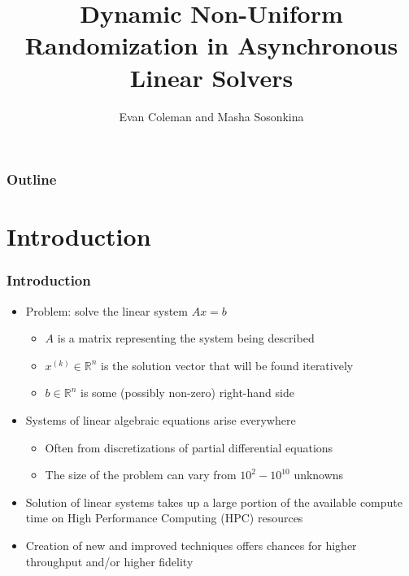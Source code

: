 \documentclass{beamer}
\title[Randomized Asynchronous Linear Solvers]{Dynamic Non-Uniform Randomization in Asynchronous Linear Solvers}
\author[Coleman \& Sosonkina]{Evan Coleman and Masha Sosonkina}
\date{}
\begin{document}
%
\begin{frame}
	\titlepage
\end{frame}


\begin{frame}
	\frametitle{Outline}
	\tableofcontents
\end{frame}

\section{Introduction}

\begin{frame}
	\frametitle{Introduction}
	\begin{itemize}
		\item Problem: solve the linear system $Ax = b$
			\begin{itemize}
				\item $A$ is a matrix representing the system being described
				\item $x^{(k)} \in \mathbb{R}^n$ is the solution vector that will be found iteratively
				\item $b \in \mathbb{R}^n$ is some (possibly non-zero) right-hand side
			\end{itemize}
		\item Systems of linear algebraic equations arise everywhere
			\begin{itemize}
				\item Often from discretizations of partial differential equations
				\item The size of the problem can vary from $10^2 - 10^{10}$ unknowns
			\end{itemize}
		\item Solution of linear systems takes up a large portion of the available compute time on High Performance Computing (HPC) resources
		\item Creation of new and improved techniques offers chances for higher throughput and/or higher fidelity
	\end{itemize}	
\end{frame}
\end{document}
